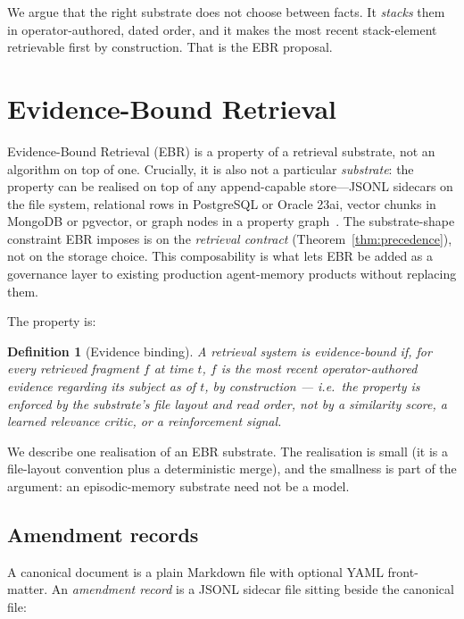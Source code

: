 \documentclass[11pt,a4paper]{article}
\newtheorem{definition}{Definition}
\begin{document}
\noindent
We argue that the right substrate does not choose between facts. It \emph{stacks} them
in operator-authored, dated order, and it makes the most recent stack-element retrievable
first by construction. That is the EBR proposal.

\section{Evidence-Bound Retrieval}
\label{sec:ebr}

\noindent
Evidence-Bound Retrieval (EBR) is a property of a retrieval substrate, not an algorithm
on top of one. Crucially, it is also not a particular \emph{substrate}: the
property can be realised on top of any append-capable store---JSONL sidecars
on the file system, relational rows in PostgreSQL or Oracle 23ai, vector
chunks in MongoDB or pgvector, or graph nodes in a property
graph~\cite{oracleOAMP2026, mongoMemoriz2026}. The substrate-shape constraint
EBR imposes is on the \emph{retrieval contract} (Theorem~\ref{thm:precedence}),
not on the storage choice. This composability is what lets EBR be added as a
governance layer to existing production agent-memory products without
replacing them.

\noindent
The property is:

\begin{definition}[Evidence binding]
\label{def:ebr}
A retrieval system is \emph{evidence-bound} if, for every retrieved fragment $f$ at time
$t$, $f$ is the most recent operator-authored evidence regarding its subject as of $t$,
by construction --- i.e.\ the property is enforced by the substrate's file layout and
read order, not by a similarity score, a learned relevance critic, or a reinforcement
signal.
\end{definition}

\noindent
We describe one realisation of an EBR substrate. The realisation is small (it is a
file-layout convention plus a deterministic merge), and the smallness is part of the
argument: an episodic-memory substrate need not be a model.

\subsection{Amendment records}
\label{sec:amendments}

\noindent
A canonical document is a plain Markdown file with optional YAML front-matter. An
\emph{amendment record} is a JSONL sidecar file sitting beside the canonical file:
\end{document}
